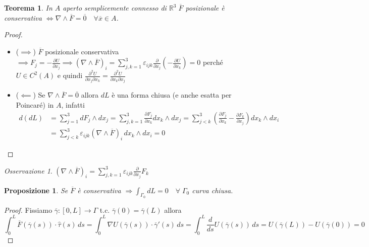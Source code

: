 \documentclass{book}
\theoremstyle{plain}
\newtheorem{teo}{Teorema}[chapter]
\theoremstyle{plain}
\theoremstyle{plain}
\theoremstyle{plain}
\theoremstyle{plain}
\newtheorem{prop}{Proposizione}[chapter]
\theoremstyle{definition}
\theoremstyle{remark}
\newtheorem*{oss}{Osservazione}
\theoremstyle{definition}
\begin{document}
\begin{teo}
    In $A$ aperto semplicemente connesso di $\mathbb{R}^{3} \; \overline{F}$ posizionale è conservativa $\iff \nabla \wedge \overline{F}=\overline{0} \quad \forall \overline{x} \in A$. 
\end{teo}

\begin{proof}

    \noindent 
    \begin{itemize}
        \item ($\implies$) $\overline{F}$ posizionale conservativa $\implies F_j=-\frac{\partial U}{\partial x_j}\implies(\nabla\wedge\overline{F})_i=\sum_{j,k=1}^3\varepsilon_{ijk}\frac{\partial}{\partial x_j}\left(-\frac{\partial U}{\partial x_k}\right)=0$ perché $U\in C^2(A)$ e quindi $\frac{\partial^2U}{\partial x_j \partial x_k}=\frac{\partial^2U}{\partial x_k \partial x_j}$
        \item ($\impliedby$) Se $\nabla\wedge\overline{F}=\overline{0}$ allora $dL$ è una forma chiusa (e anche esatta per Poincaré) in $A$, infatti
        \[
        \begin{split}
            d(dL)&=\sum_{j=1}^3dF_j\wedge dx_j=\sum_{j,k=1}^3\frac{\partial F_j}{\partial x_k}dx_k\wedge dx_j=\sum_{j<k}^3\left(\frac{\partial F_j}{\partial x_k}-\frac{\partial F_k}{\partial x_j}\right)dx_k\wedge dx_i \\
            &=\sum_{j<k}^3\varepsilon_{ijk}(\nabla\wedge\overline{F})_i\,dx_k\wedge dx_i=0
        \end{split}
        \]
    \end{itemize}
\end{proof}

\begin{oss}
    $(\nabla \wedge \overline{F})_{i}=\sum_{j, k=1}^{3} \varepsilon_{i j k} \frac{\partial}{\partial x_{j}} F_{k}$
\end{oss}

\begin{prop}
\everymath{\displaystyle}
    Se $\overline{F}$ è conservativa $\Longrightarrow \int_{\Gamma_0} dL=0 \quad \forall \; \Gamma_0$ curva chiusa.
\end{prop}

\begin{proof}
    Fissiamo $\overline{\gamma}: [0, L] \to \Gamma$ t.c. $\overline{\gamma}(0)=\overline{\gamma}(L)$ allora
    \begin{displaymath}
        \int_0^L\overline{F}(\overline{\gamma}(s))\cdot\hat{\tau}(s)\,ds=\int_0^L\nabla U(\overline{\gamma}(s))\cdot\overline{\gamma}'(s)\,ds=\int_0^L\frac{d}{ds}U(\overline{\gamma}(s))\,ds=U(\overline{\gamma}(L))-U(\overline{\gamma}(0))=0
    \end{displaymath}
\end{proof}
\end{document}
